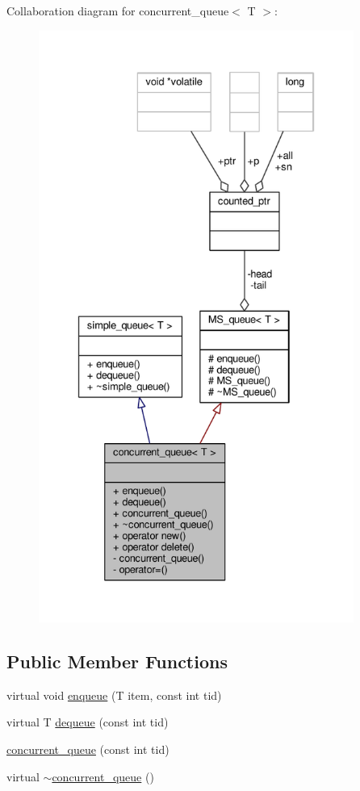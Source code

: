 Collaboration diagram for concurrent\-\_\-queue$<$ T $>$\-:
\nopagebreak
\begin{figure}[H]
\begin{center}
\leavevmode
\includegraphics[height=550pt]{classconcurrent__queue__coll__graph}
\end{center}
\end{figure}
\subsection*{Public Member Functions}
\begin{DoxyCompactItemize}
\item 
virtual void \hyperlink{classconcurrent__queue_a8c549b70d8e6f899b9b55c6f8eacce22}{enqueue} (T item, const int tid)
\item 
virtual T \hyperlink{classconcurrent__queue_a3ae2645ff7b16a7a317c1cff6142a9db}{dequeue} (const int tid)
\item 
\hyperlink{classconcurrent__queue_a3d9b58f8a227b27b6103342ab3995d75}{concurrent\-\_\-queue} (const int tid)
\item 
virtual \hyperlink{classconcurrent__queue_a7f5dd1d84bdf863f47b6e402ca4829c5}{$\sim$concurrent\-\_\-queue} ()
\end{DoxyCompactItemize}
